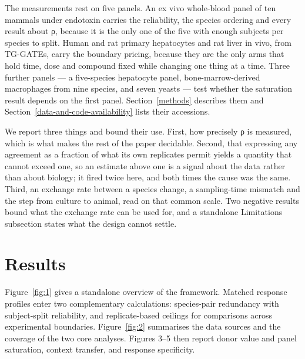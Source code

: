 \documentclass[11pt,a4paper]{article}
\begin{document}
The measurements rest on five panels. An ex vivo whole-blood panel of
ten mammals under endotoxin carries the reliability, the species
ordering and every result about ρ, because it is the only one of the
five with enough subjects per species to split. Human and rat primary
hepatocytes and rat liver in vivo, from TG-GATEs, carry the boundary
pricing, because they are the only arms that hold time, dose and
compound fixed while changing one thing at a time. Three further panels
--- a five-species hepatocyte panel, bone-marrow-derived macrophages
from nine species, and seven yeasts --- test whether the saturation
result depends on the first panel. Section~\ref{methods} describes them and Section~\ref{data-and-code-availability} lists their accessions.

We report three things and bound their use. First, how precisely ρ is
measured, which is what makes the rest of the paper decidable. Second,
that expressing any agreement as a fraction of what its own replicates
permit yields a quantity that cannot exceed one, so an estimate above
one is a signal about the data rather than about biology; it fired twice
here, and both times the cause was the same. Third, an exchange rate
between a species change, a sampling-time mismatch and the step from
culture to animal, read on that common scale. Two negative results bound
what the exchange rate can be used for, and a standalone Limitations
subsection states what the design cannot settle.

\section{Results}\label{results}

Figure~\ref{fig:1} gives a standalone overview of the framework. Matched response
profiles enter two complementary calculations: species-pair redundancy
with subject-split reliability, and replicate-based ceilings for
comparisons across experimental boundaries. Figure~\ref{fig:2} summarises the data
sources and the coverage of the two core analyses. Figures 3--5 then
report donor value and panel saturation, context transfer, and response
specificity.
\end{document}
